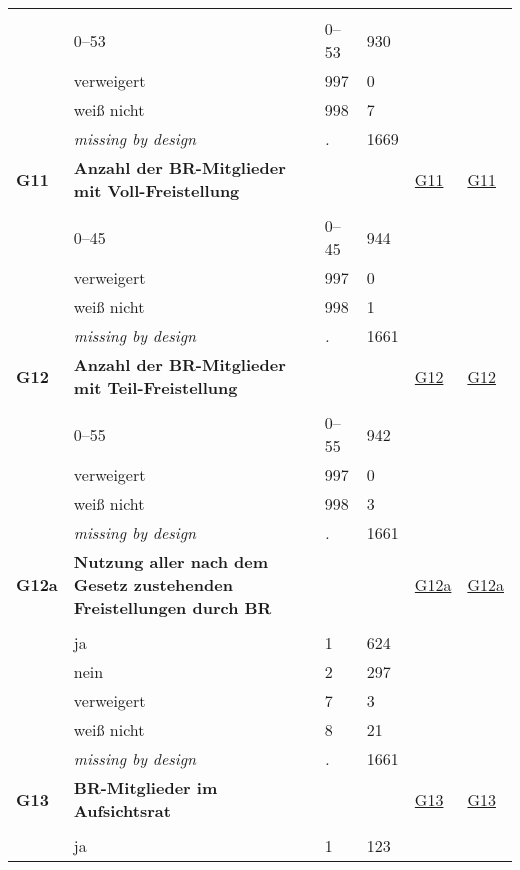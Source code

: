 \begin{longtable}{| L{2.45cm} | L{6cm} | C{1.5cm} | R{1cm} | C{2.25cm} | C{2.25cm} |}
   &  &  &  &  &  \\ 
   & 0--53 & 0--53 & 930 &  &  \\ 
   & verweigert & 997 & 0 &  &  \\ 
   & weiß nicht & 998 & 7 &  &  \\ 
   & \textit{missing by design} & \textit{.} & 1669 &  &  \\ 
   \midrule
\textbf{G11}\label{var:G11} & \textbf{Anzahl der BR-Mitglieder mit Voll-Freistellung} &  &  & \hyperref[G11]{G11} & \hyperref[var:suf:G11]{G11} \\ 
   &  &  &  &  &  \\ 
   & 0--45 & 0--45 & 944 &  &  \\ 
   & verweigert & 997 & 0 &  &  \\ 
   & weiß nicht & 998 & 1 &  &  \\ 
   & \textit{missing by design} & \textit{.} & 1661 &  &  \\ 
   \midrule
\textbf{G12}\label{var:G12} & \textbf{Anzahl der BR-Mitglieder mit Teil-Freistellung} &  &  & \hyperref[G12]{G12} & \hyperref[var:suf:G12]{G12} \\ 
   &  &  &  &  &  \\ 
   & 0--55 & 0--55 & 942 &  &  \\ 
   & verweigert & 997 & 0 &  &  \\ 
   & weiß nicht & 998 & 3 &  &  \\ 
   & \textit{missing by design} & \textit{.} & 1661 &  &  \\ 
   \midrule
\textbf{G12a}\label{var:G12a} & \textbf{Nutzung aller nach dem Gesetz zustehenden Freistellungen durch BR} &  &  & \hyperref[G12a]{G12a} & \hyperref[var:suf:G12a]{G12a} \\ 
   &  &  &  &  &  \\ 
   & ja & 1 & 624 &  &  \\ 
   & nein & 2 & 297 &  &  \\ 
   & verweigert & 7 & 3 &  &  \\ 
   & weiß nicht & 8 & 21 &  &  \\ 
   & \textit{missing by design} & \textit{.} & 1661 &  &  \\ 
   \midrule
\textbf{G13}\label{var:G13} & \textbf{BR-Mitglieder im Aufsichtsrat} &  &  & \hyperref[G13]{G13} & \hyperref[var:suf:G13]{G13} \\ 
   &  &  &  &  &  \\ 
   & ja & 1 & 123 &  &  \\ 

\end{longtable}
